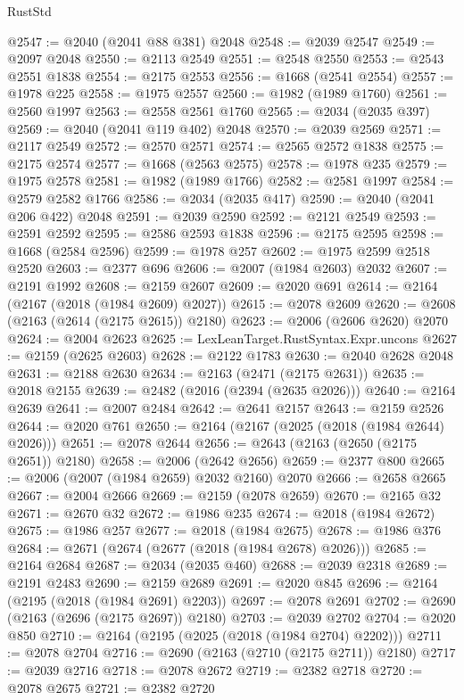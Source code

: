 \begin{lexlean}{RustStd}
\begin{coremodule}
@2547 := @2040 (@2041 @88 @381) @2048
@2548 := @2039 @2547
@2549 := @2097 @2048
@2550 := @2113 @2549
@2551 := @2548 @2550
@2553 := @2543 @2551 @1838
@2554 := @2175 @2553
@2556 := @1668 (@2541 @2554)
@2557 := @1978 @225
@2558 := @1975 @2557
@2560 := @1982 (@1989 @1760)
@2561 := @2560 @1997
@2563 := @2558 @2561 @1760
@2565 := @2034 (@2035 @397)
@2569 := @2040 (@2041 @119 @402) @2048
@2570 := @2039 @2569
@2571 := @2117 @2549
@2572 := @2570 @2571
@2574 := @2565 @2572 @1838
@2575 := @2175 @2574
@2577 := @1668 (@2563 @2575)
@2578 := @1978 @235
@2579 := @1975 @2578
@2581 := @1982 (@1989 @1766)
@2582 := @2581 @1997
@2584 := @2579 @2582 @1766
@2586 := @2034 (@2035 @417)
@2590 := @2040 (@2041 @206 @422) @2048
@2591 := @2039 @2590
@2592 := @2121 @2549
@2593 := @2591 @2592
@2595 := @2586 @2593 @1838
@2596 := @2175 @2595
@2598 := @1668 (@2584 @2596)
@2599 := @1978 @257
@2602 := @1975 @2599 @2518 @2520
@2603 := @2377 @696
@2606 := @2007 (@1984 @2603) @2032
@2607 := @2191 @1992
@2608 := @2159 @2607
@2609 := @2020 @691
@2614 := @2164 (@2167 (@2018 (@1984 @2609) @2027))
@2615 := @2078 @2609
@2620 := @2608 (@2163 (@2614 (@2175 @2615)) @2180)
@2623 := @2006 (@2606 @2620) @2070
@2624 := @2004 @2623
@2625 := LexLeanTarget.RustSyntax.Expr.uncons
@2627 := @2159 (@2625 @2603)
@2628 := @2122 @1783
@2630 := @2040 @2628 @2048
@2631 := @2188 @2630
@2634 := @2163 (@2471 (@2175 @2631))
@2635 := @2018 @2155
@2639 := @2482 (@2016 (@2394 (@2635 @2026)))
@2640 := @2164 @2639
@2641 := @2007 @2484
@2642 := @2641 @2157
@2643 := @2159 @2526
@2644 := @2020 @761
@2650 := @2164 (@2167 (@2025 (@2018 (@1984 @2644) @2026)))
@2651 := @2078 @2644
@2656 := @2643 (@2163 (@2650 (@2175 @2651)) @2180)
@2658 := @2006 (@2642 @2656)
@2659 := @2377 @800
@2665 := @2006 (@2007 (@1984 @2659) @2032 @2160) @2070
@2666 := @2658 @2665
@2667 := @2004 @2666
@2669 := @2159 (@2078 @2659)
@2670 := @2165 @32
@2671 := @2670 @32
@2672 := @1986 @235
@2674 := @2018 (@1984 @2672)
@2675 := @1986 @257
@2677 := @2018 (@1984 @2675)
@2678 := @1986 @376
@2684 := @2671 (@2674 (@2677 (@2018 (@1984 @2678) @2026)))
@2685 := @2164 @2684
@2687 := @2034 (@2035 @460)
@2688 := @2039 @2318
@2689 := @2191 @2483
@2690 := @2159 @2689
@2691 := @2020 @845
@2696 := @2164 (@2195 (@2018 (@1984 @2691) @2203))
@2697 := @2078 @2691
@2702 := @2690 (@2163 (@2696 (@2175 @2697)) @2180)
@2703 := @2039 @2702
@2704 := @2020 @850
@2710 := @2164 (@2195 (@2025 (@2018 (@1984 @2704) @2202)))
@2711 := @2078 @2704
@2716 := @2690 (@2163 (@2710 (@2175 @2711)) @2180)
@2717 := @2039 @2716
@2718 := @2078 @2672
@2719 := @2382 @2718
@2720 := @2078 @2675
@2721 := @2382 @2720

\end{coremodule}
\end{lexlean}
